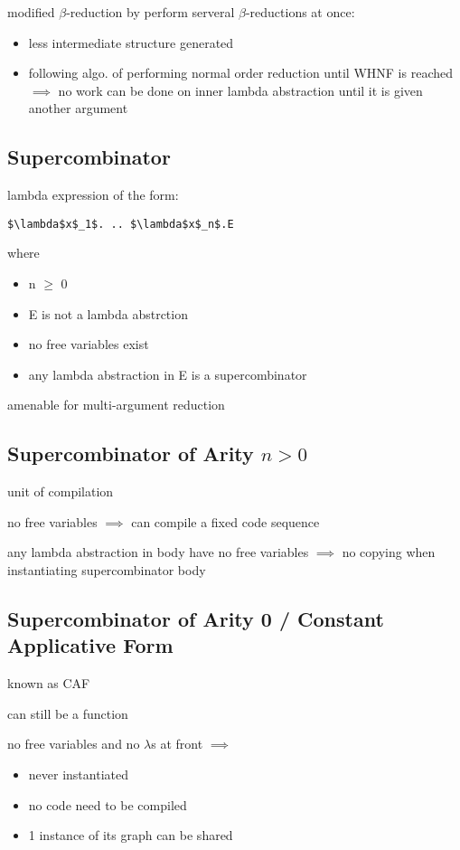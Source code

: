 \documentclass[8pt]{extarticle}
\begin{document}
\begin{multicols*}{2}
modified $\beta$-reduction by perform serveral $\beta$-reductions at once:
\begin{itemize}
\item less intermediate structure generated
\item following algo. of performing normal order reduction until WHNF is reached $\implies$ no work can be done on inner lambda abstraction until it is given another argument
\end{itemize}

\subsection{Supercombinator}

lambda expression of the form:
\begin{lstlisting}
$\lambda$x$_1$. .. $\lambda$x$_n$.E
\end{lstlisting}
where
\begin{itemize}
\item n $\geq$ 0
\item E is not a lambda abstrction
\item no free variables exist
\item any lambda abstraction in E is a supercombinator
\end{itemize}

amenable for multi-argument reduction

\subsection{Supercombinator of Arity $n>0$}
unit of compilation

no free variables $\implies$ can compile a fixed code sequence

any lambda abstraction in body have no free variables $\implies$ no copying when instantiating supercombinator body

\subsection{Supercombinator of Arity 0 / Constant Applicative Form}

known as CAF

can still be a function

no free variables and no $\lambda$s at front $\implies$
\begin{itemize}
\item never instantiated
\item  no code need to be compiled
\item 1 instance of its graph can be shared
\end{itemize}


\end{multicols*}
\end{document}
